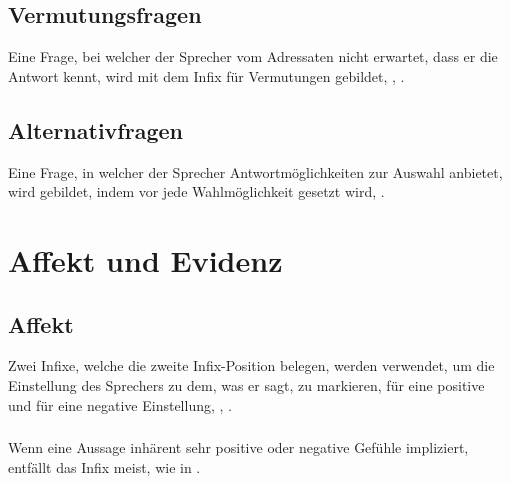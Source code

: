 \subsection{Vermutungsfragen} Eine Frage, bei welcher der Sprecher vom Adressaten nicht erwartet, dass er die Antwort kennt, wird mit dem Infix für Vermutungen  gebildet,  ,  .

\subsection{Alternativfragen} Eine Frage, in welcher der Sprecher Antwortmöglichkeiten zur Auswahl anbietet, wird gebildet, indem  vor jede Wahlmöglichkeit gesetzt wird,  .

\section{Affekt und Evidenz}

\subsection{Affekt} Zwei Infixe, welche die zweite Infix-Position belegen, werden verwendet, um die Einstellung des Sprechers zu dem, was er sagt, zu markieren,  für eine positive und  für eine negative Einstellung,  ,  . 

\subsubsection{} Wenn eine Aussage inhärent sehr positive oder negative Gefühle impliziert, entfällt das Infix meist, wie in  .

